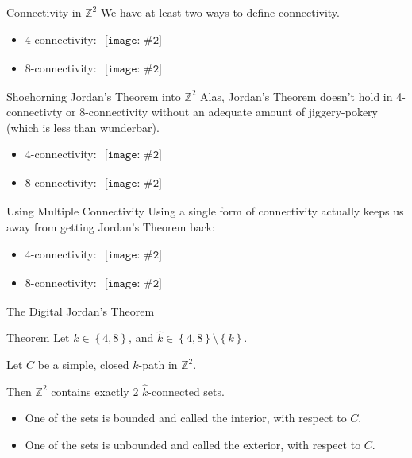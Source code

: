 \documentclass{beamer}
\newcommand{\pic}[2]{
     \begin{array}{l}
      \texttt{[image: \#2]}
      \end{array}
}
\newcommand{\horizline}{\par\hrulefill}
\newcommand{\set}[1]{\left\lbrace #1 \right\rbrace}
\newcommand{\integers}{\mathbb{Z}}
\begin{document}
\begin{frame}{Connectivity in $\integers^2$}
  We have at least two ways to define connectivity.
  \begin{itemize}
    \item 4-connectivity: $\pic{width=50pt}{images/4connectivity.png}$\horizline
    \item 8-connectivity: $\pic{width=50pt}{images/8connectivity.png}$
  \end{itemize} 
\end{frame}

\begin{frame}{Shoehorning Jordan's Theorem into $\integers^2$}
  Alas, Jordan's Theorem doesn't hold in 4-connectivty or 8-connectivity
  without an adequate amount of  jiggery-pokery (which is less than 
  wunderbar).

  \begin{itemize}
    \item 4-connectivity: $\pic{width=50pt}{images/4connectivity_blunder1.png}$\horizline
    \item 8-connectivity: $\pic{width=50pt}{images/8connectivity_blunder1.png}$
  \end{itemize}
\end{frame}

\begin{frame}{Using Multiple Connectivity}
 Using a single form of connectivity actually keeps us away from 
 getting Jordan's Theorem back:
 \begin{itemize}
    \item 4-connectivity: $\pic{width=50pt}{images/4connectivity_blunder2.png}$\horizline
    \item 8-connectivity: $\pic{width=50pt}{images/8connectivity_blunder2.png}$
 \end{itemize}   
\end{frame}

\begin{frame}{The Digital Jordan's Theorem}
\begin{block}{Theorem}
  Let $k \in \set{4,8}$, and $\hat{k}\in \set{4,8}\setminus \set{k}$.

  Let $C$ be a simple, closed $k$-path in $\integers^2$.
  
  Then $\integers^2$ contains exactly 2 $\hat{k}$-connected sets.
  \begin{itemize}
    \item One of the sets is bounded and called the interior, with
          respect to $C$.
    \item One of the sets is unbounded and called the exterior, with
          respect to $C$.
  \end{itemize}
\end{block}
\end{frame}
\end{document}
